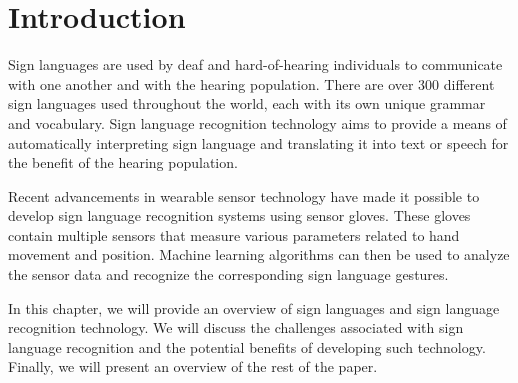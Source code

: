 \section{Introduction}
Sign languages are used by deaf and hard-of-hearing individuals to communicate with one another and with the hearing population. There are over 300 different sign languages used throughout the world, each with its own unique grammar and vocabulary. Sign language recognition technology aims to provide a means of automatically interpreting sign language and translating it into text or speech for the benefit of the hearing population.

Recent advancements in wearable sensor technology have made it possible to develop sign language recognition systems using sensor gloves. These gloves contain multiple sensors that measure various parameters related to hand movement and position. Machine learning algorithms can then be used to analyze the sensor data and recognize the corresponding sign language gestures.

In this chapter, we will provide an overview of sign languages and sign language recognition technology. We will discuss the challenges associated with sign language recognition and the potential benefits of developing such technology. Finally, we will present an overview of the rest of the paper.